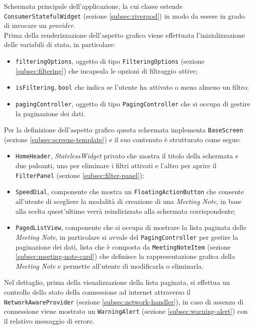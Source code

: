 Schermata principale dell'applicazione, la cui classe estende \lstinline{ConsumerStatefulWidget} (sezione \ref{subsec:riverpod}) in modo da essere in grado di invocare un \emph{provider}. \\
Prima della renderizzazione dell'aspetto grafico viene effettuata l'inizializzazione delle variabili di stato, in particolare:
\begin{itemize}
    \item \lstinline{filteringOptions}, oggetto di tipo \lstinline{FilteringOptions} (sezione \ref{subsec:filtering}) che incapsula le opzioni di filtraggio attive;
    \item \lstinline{isFiltering}, \lstinline{bool} che indica se l'utente ha attivato o meno almeno un filtro;
    \item \lstinline{pagingController}, oggetto di tipo \lstinline{PagingController}\cite{site:infinite-scroll-pagination} che si occupa di gestire la paginazione dei dati.
\end{itemize}
Per la definizione dell'aspetto grafico questa schermata implementa \lstinline{BaseScreen} (sezione \ref{subsec:screens-template}) e il suo contenuto è strutturato come segue:
\begin{itemize}
    \item \lstinline{HomeHeader}, \emph{StatelessWidget} privato che mostra il titolo della schermata e due pulsanti, uno per eliminare i filtri attivati e l'altro per aprire il \lstinline{FilterPanel} (sezione \ref{subsec:filter-panel});
    \item \lstinline{SpeedDial}, componente che mostra un \lstinline{FloatingActionButton}\cite{site:fab} che consente all'utente di scegliere la modalità di creazione di una \emph{Meeting Note}, in base alla scelta quest'ultimo verrà reindirizzato alla schermata corrispondente;
    \item \lstinline{PagedListView}\cite{site:infinite-scroll-pagination}, componente che si occupa di mostrare la lista paginata delle \emph{Meeting Note}, in particolare si avvale del \lstinline{PagingController} per gestire la paginazione dei dati, lista che è composta da \lstinline{MeetingNoteItem} (sezione \ref{subsec:meeting-note-card}) che definisce la rappresentazione grafica della \emph{Meeting Note} e permette all'utente di modificarla o eliminarla.
\end{itemize}
Nel dettaglio, prima della visualizzazione della lista paginata, si effettua un controllo dello stato della connessione ad internet attraverso il \lstinline{NetworkAwareProvider} (sezione \ref{subsec:network-handler}), in caso di assenza di connessione viene mostrato un \lstinline{WarningAlert} (sezione \ref{subsec:warning-alert}) con il relativo messaggio di errore. \\
